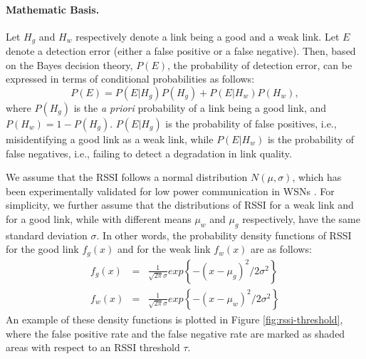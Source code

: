 \paragraph{Mathematic Basis.} Let $H_g$ and $H_w$ respectively denote a link being a good and a weak link. Let $E$ denote a detection error (either a false positive or a false negative). Then, based on the Bayes decision theory, $P(E)$, the probability of detection error, can be expressed in terms of conditional probabilities as follows:
\setlength{\belowdisplayskip}{4pt} \setlength{\belowdisplayshortskip}{4pt}
\setlength{\abovedisplayskip}{4pt} \setlength{\abovedisplayshortskip}{4pt}
\begin{equation} \label{equ:bayesRule}
	P(E) = P(E|H_g)P(H_g) + P(E|H_w)P(H_w),
\end{equation}
where $P(H_g)$ is the \textit{a priori} probability of a link being a good link, and $P(H_w)=1-P(H_g)$. $P(E|H_g)$ is the probability of false positives, i.e., misidentifying a good link as a weak link, while $P(E|H_w)$ is the probability of false negatives, i.e., failing to detect a degradation in link quality. 

We assume that the RSSI follows a normal distribution $N(\mu, \sigma)$,
which has been experimentally validated for low power communication in WSNs \cite{7164923, Rappaport:1996:WCP:525688}. For simplicity, we further assume that the distributions of RSSI for a weak link and for a good link, while with different means  $\mu_w$ and $\mu_g$ respectively, have the same standard deviation $\sigma$. In other words, the probability density functions of RSSI for the good link $f_g(x)$ and for the weak link $f_w(x)$ are as follows:
\begin{eqnarray}
	f_g(x) &=& \frac{1}{\sqrt{2\pi}\sigma}exp\left\lbrace -(x-\mu_g)^2 / 2\sigma^2\right\rbrace \label{equ:pdfWeak} \\
	f_w(x) &=& \frac{1}{\sqrt{2\pi}\sigma}exp\left\lbrace -(x-\mu_w)^2 / 2\sigma^2\right\rbrace \label{equ:pdfGood}
\end{eqnarray}
An example of these density functions is plotted in Figure \ref{fig:rssi-threshold}, where the false positive rate and the false negative rate are marked as shaded areas with respect to an RSSI threshold $\tau$. 


